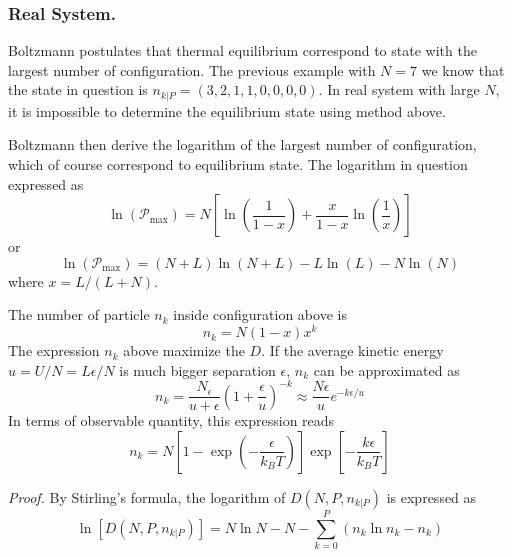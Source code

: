 \documentclass[../../../Main.tex]{subfiles}
\begin{document}
\subsubsection{ Real\textsuperscript{\texttrademark} System.} Boltzmann postulates that thermal equilibrium correspond to state with the largest number of configuration. The previous example with $N=7$ we know that the state in question is $n_{k|P}=(3, 2, 1, 1, 0, 0, 0, 0)$. In real system with large $N$, it is impossible to determine the equilibrium state using method above.

Boltzmann then derive the logarithm of the largest number of configuration, which of course correspond to equilibrium state. The logarithm in question expressed as 
\begin{equation*}
    \ln(\mathcal{P}_\text{max})=N\left[\ln \left(\frac{1}{1-x}\right)+\frac{x}{1-x}\ln \left(\frac{1}{x}\right)\right]
\end{equation*}
or
\begin{equation*}
    \ln(\mathcal{P}_\text{max})= (N+L)\ln (N+L) - L\ln (L)-N\ln (N)
\end{equation*}
where $x=L/(L+N)$. 

The number of particle $n_k$ inside configuration above is 
\begin{equation*}
    n_k=N(1-x)x^k
\end{equation*}
The expression $n_k$ above maximize the $D$. If the average kinetic energy $u=U/N=L\epsilon/N$ is much bigger separation $\epsilon$, $n_k$ can be approximated as 
\begin{equation*}
    n_k=\frac{N_\epsilon}{u+\epsilon}\left(1+\frac{\epsilon}{u}\right)^{-k}\approx\frac{N\epsilon}{u}e^{-k\epsilon/u}
\end{equation*}
In terms of observable quantity, this expression reads 
\begin{equation*}
    n_k=N\left[1-\exp\left(-\frac{\epsilon}{k_BT}\right)\right]\exp\left[-\frac{k\epsilon}{k_BT}\right]
\end{equation*}

\emph{Proof.} By Stirling’s formula, the logarithm of $D(N , P, n_{k|P} )$ is expressed as
\begin{equation*}
    \ln\left[D(N , P, n_{k|P} )\right]=N\ln N-N-\sum_{k=0}^{P}\left(n_k\ln n_k-n_k\right)
\end{equation*}
\end{document}
